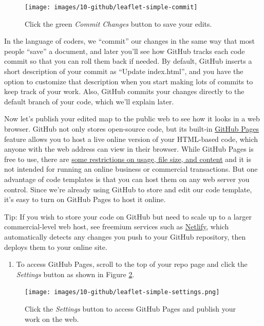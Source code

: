 \documentclass[
  english,
]{book}
\providecommand{\tightlist}{%
  \setlength{\itemsep}{0pt}\setlength{\parskip}{0pt}}
\begin{document}
\begin{figure}
\texttt{[image: images/10-github/leaflet-simple-commit]} \caption{Click the green \emph{Commit Changes} button to save your edits.}\label{fig:leaflet-simple-commit}
\end{figure}

In the language of coders, we ``commit'' our changes in the same way that most people ``save'' a document, and later you'll see how GitHub tracks each code commit so that you can roll them back if needed. By default, GitHub inserts a short description of your commit as ``Update index.html'', and you have the option to customize that description when you start making lots of commits to keep track of your work. Also, GitHub commits your changes directly to the default branch of your code, which we'll explain later.

Now let's publish your edited map to the public web to see how it looks in a web browser. GitHub not only stores open-source code, but its built-in \href{https://pages.github.com/}{GitHub Pages} feature allows you to host a live online version of your HTML-based code, which anyone with the web address can view in their browser. While GitHub Pages is free to use, there are \href{https://help.github.com/en/github/working-with-github-pages/about-github-pages}{some restrictions on usage, file size, and content} and it is not intended for running an online business or commercial transactions. But one advantage of code templates is that you can host them on any web server you control. Since we're already using GitHub to store and edit our code template, it's easy to turn on GitHub Pages to host it online.

Tip: If you wish to store your code on GitHub but need to scale up to a larger commercial-level web host, see freemium services such as \href{https://www.netlify.com}{Netlify}, which automatically detects any changes you push to your GitHub repository, then deploys them to your online site.

\begin{enumerate}
\def\labelenumi{\arabic{enumi}.}
\setcounter{enumi}{8}
\tightlist
\item
  To access GitHub Pages, scroll to the top of your repo page and click the \emph{Settings} button as shown in Figure \ref{fig:leaflet-simple-settings}.
\end{enumerate}



\begin{figure}
\centering
\texttt{[image: images/10-github/leaflet-simple-settings.png]}
\caption{\label{fig:leaflet-simple-settings}Click the \emph{Settings} button to access GitHub Pages and publish your work on the web.}
\end{figure}
\end{document}
